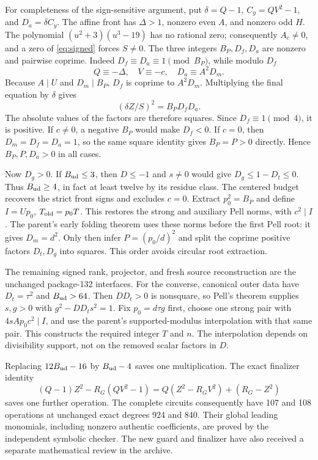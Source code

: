 For completeness of the sign-sensitive argument, put
$\delta=Q-1$, $C_y=QV^2-1$, and $D_a=\delta C_y$.
The affine front has $\Delta>1$, nonzero even $A$, and nonzero odd $H$.
The polynomial $(u^2+3)(u^3-19)$ has no rational zero; consequently
$A_c\ne0$, and a zero of \eqref{eq:signed} forces $S\ne0$.
The three integers $B_P,D_f,D_a$ are nonzero and pairwise coprime.
Indeed $D_f\equiv D_a\equiv1\pmod{B_P}$, while modulo $D_f$
\[
 Q\equiv-\Delta,\quad V\equiv-c,\quad
 D_a\equiv A^2D_m.
\]
Because $A\mid U$ and $D_m\mid B_P$, $D_f$ is coprime to $A^2D_m$.
Multiplying the final equation by $\delta$ gives
\[
 (\delta Z/S)^2=B_PD_fD_a.
\]
The absolute values of the factors are therefore squares. Since
$D_f\equiv1\pmod4$, it is positive. If $c\ne0$, a negative $B_P$ would
make $D_f<0$. If $c=0$, then $D_m=D_f=D_a=1$, so the same square identity
gives $B_P=P>0$ directly. Hence $B_P,P,D_a>0$ in all cases.

Now $D_g>0$. If $B_{\rm ud}\le3$, then $D\le-1$ and $s\ne0$ would
give $D_g\le1-D_t\le0$. Thus $B_{\rm ud}\ge4$, in fact at least twelve
by its residue class. The centered budget recovers the strict front signs
and excludes $c=0$. Extract $p_0^2=B_P$ and define $I=Up_0$,
$T_{\rm old}=p_0T$. This restores the strong and auxiliary Pell norms,
with $c^2\mid I$. The parent's early folding theorem uses these norms
before the first Pell root: it gives $D_m=d^2$. Only then infer
$P=(p_0/d)^2$ and split the coprime positive factors $D_t,D_g$ into
squares. This order avoids circular root extraction.

The remaining signed rank, projector, and fresh source reconstruction are
the unchanged package-132 interfaces. For the converse, canonical outer
data have $D_t=\tau^2$ and $B_{\rm ud}>64$. Then $DD_t>0$ is nonsquare,
so Pell's theorem supplies $s,g>0$ with $g^2-DD_ts^2=1$. Fix
$p_0=d\tau g$ first, choose one strong pair with
$4sAp_0c^2\mid I$, and use the parent's supported-modulus interpolation
with that same pair. This constructs the required integer $T$ and $n$.
The interpolation depends on divisibility support, not on the removed
scalar factors in $D$.

Replacing $12B_{\rm ud}-16$ by $B_{\rm ud}-4$ saves one multiplication.
The exact finalizer identity
\[
 (Q-1)Z^2-R_G(QV^2-1)
 =Q(Z^2-R_GV^2)+(R_G-Z^2)
\]
saves one further operation. The complete circuits consequently have 107
and 108 operations at unchanged exact degrees 924 and 840. Their global
leading monomials, including nonzero authentic coefficients, are proved
by the independent symbolic checker. The new guard and finalizer have
also received a separate mathematical review in the archive.
